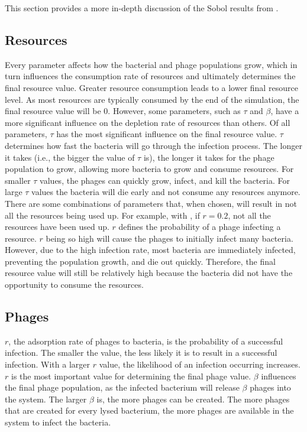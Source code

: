 This section provides a more in-depth discussion of the Sobol results from . 

\subsection{Resources}
Every parameter affects how the bacterial and phage populations grow, which in turn influences the consumption rate of resources and ultimately determines the final resource value. 
Greater resource consumption leads to a lower final resource level.
As most resources are typically consumed by the end of the simulation, the final resource value will be 0. 
However, some parameters, such as $\tau$ and $\beta$, have a more significant influence on the depletion rate of resources than others. 
Of all parameters, $\tau$ has the most significant influence on the final resource value. 
$\tau$ determines how fast the bacteria will go through the infection process. 
The longer it takes (i.e., the bigger the value of $\tau$ is), the longer it takes for the phage population to grow, allowing more bacteria to grow and consume resources. 
For smaller $\tau$ values, the phages can quickly grow, infect, and kill the bacteria. 
For large $\tau$ values the bacteria will die early and not consume any resources anymore. 
There are some combinations of parameters that, when chosen, will result in not all the resources being used up. 
For example, with , if $r = 0.2$, not all the resources have been used up. 
$r$ defines the probability of a phage infecting a resource. 
$r$ being so high will cause the phages to initially infect many bacteria. 
However, due to the high infection rate, most bacteria are immediately infected, preventing the population growth, and die out quickly. 
Therefore, the final resource value will still be relatively high because the bacteria did not have the opportunity to consume the resources. 

\subsection{Phages}
$r$, the adsorption rate of phages to bacteria, is the probability of a successful infection. 
The smaller the value, the less likely it is to result in a successful infection. 
With a larger $r$ value, the likelihood of an infection occurring increases. 
$r$ is the most important value for determining the final phage value. 
$\beta$ influences the final phage population, as the infected bacterium will release $\beta$ phages into the system. 
The larger $\beta$ is, the more phages can be created. 
The more phages that are created for every lysed bacterium, the more phages are available in the system to infect the bacteria. 

